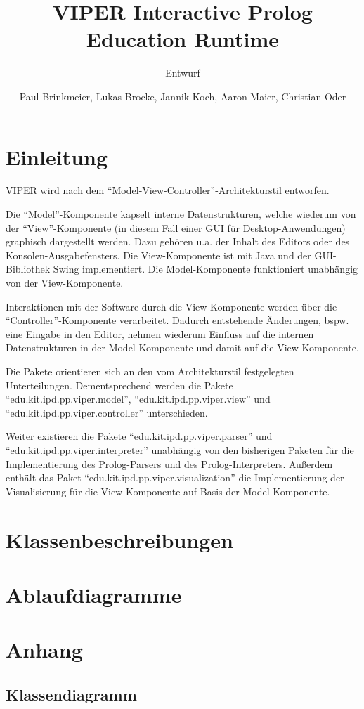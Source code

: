 \documentclass[parskip=full,11pt,twoside]{scrartcl}
\title{VIPER Interactive Prolog Education Runtime}
\subtitle{Entwurf}
\author{Paul Brinkmeier, Lukas Brocke, Jannik Koch, Aaron Maier, Christian Oder}
\begin{document}
\maketitle

\section{Einleitung}

VIPER wird nach dem \enquote{Model-View-Controller}-Architekturstil entworfen.

Die \enquote{Model}-Komponente kapselt interne Datenstrukturen, welche wiederum von der \enquote{View}-Komponente (in diesem Fall einer GUI für Desktop-Anwendungen) graphisch dargestellt werden. Dazu gehören u.a. der Inhalt des Editors oder des Konsolen-Ausgabefensters. Die View-Komponente ist mit Java und der GUI-Bibliothek Swing implementiert. Die Model-Komponente funktioniert unabhängig von der View-Komponente.

Interaktionen mit der Software durch die View-Komponente werden über die \enquote{Controller}-Komponente verarbeitet. Dadurch entstehende Änderungen, bspw. eine Eingabe in den Editor, nehmen wiederum Einfluss auf die internen Datenstrukturen in der Model-Komponente und damit auf die View-Komponente.

Die Pakete orientieren sich an den vom Architekturstil festgelegten Unterteilungen. Dementsprechend werden die Pakete \enquote{edu.kit.ipd.pp.viper.model}, \enquote{edu.kit.ipd.pp.viper.view} und \enquote{edu.kit.ipd.pp.viper.controller} unterschieden.

Weiter existieren die Pakete \enquote{edu.kit.ipd.pp.viper.parser} und \enquote{edu.kit.ipd.pp.viper.interpreter} unabhängig von den bisherigen Paketen für die Implementierung des Prolog-Parsers und des Prolog-Interpreters. Außerdem enthält das Paket \enquote{edu.kit.ipd.pp.viper.visualization} die Implementierung der Visualisierung für die View-Komponente auf Basis der Model-Komponente.

\section{Klassenbeschreibungen}

\section{Ablaufdiagramme}

\appendix

\section{Anhang}

\subsection{Klassendiagramm}
\end{document}
